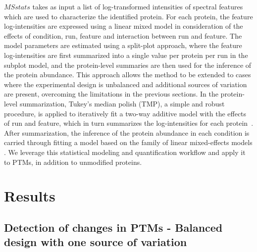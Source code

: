 \documentclass[mcp]{article}
\numberwithin{table}{section}
\begin{document}
$MSstats$ takes as input a list of log-transformed intensities of spectral features which are used to characterize the identified protein. For each protein, the feature log-intensities are expressed using a linear mixed model in consideration of the effects of condition, run, feature and interaction between run and feature. The model parameters are estimated using a split-plot approach, where the feature log-intensities are first summarized into a single value per protein per run in the subplot model, and the protein-level summaries are then used for the inference of the protein abundance. This approach allows the method to be extended to cases where the experimental design is unbalanced and additional sources of variation are present, overcoming the limitations in the previous sections. In the protein-level summarization, Tukey's median polish (TMP), a simple and robust procedure, is applied to iteratively fit a two-way additive model with the effects of run and feature, which in turn summarizes the log-intensities for each protein~\cite{Tukey:1977}. After summarization, the inference of the protein abundance in each condition is carried through fitting a model based on the family of linear mixed-effects models \cite{Bolker2009} \cite{Faraway:2006}. We leverage this statistical modeling and quantification workflow and apply it to PTMs, in addition to unmodified proteins.




\section{Results}

\subsection*{Detection of changes in PTMs - Balanced design with one source of variation}
\label{sec:adjustment_summary}
\end{document}
